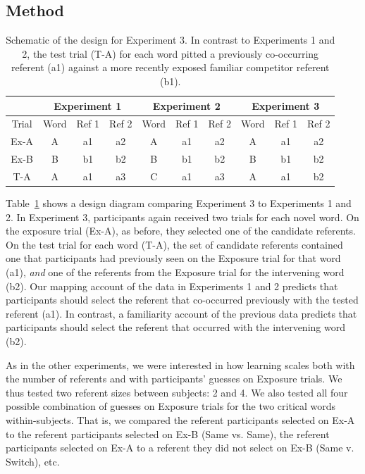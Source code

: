 \documentclass[man,floatsintext]{apa6}
\begin{document}
\subsection{Method}

\begin{table}[tb]
\begin{center}
\begin{tabular}{| c | c c c | c c c | c c c |}
\multicolumn{1}{c}{ }
 & \multicolumn{3}{c}{Experiment 1}
 & \multicolumn{3}{c}{Experiment 2}
 & \multicolumn{3}{c}{Experiment 3} \\
 \hline
Trial & Word & Ref 1 & Ref 2 & Word & Ref 1 & Ref 2 & Word & Ref 1 & Ref 2 \\ 
\hline
Ex-A& A & a1 & a2 & A & a1 & a2 & A & a1 & a2 \\ 
Ex-B & B & b1 & b2 & B & b1 & b2 & B & b1 & b2 \\ 
T-A & A & a1 & a3 & C & a1 & a3 & A & a1 & b2 \\ 
\hline
\end{tabular}
\end{center}
\vspace{6pt}
\caption{\label{tab:exp3_design}Schematic of the design for Experiment 3. In contrast to Experiments 1 and 2, the test trial (T-A) for each word pitted a previously co-occurring referent (a1) against a more recently exposed familiar competitor referent (b1).}
\end{table}

Table~\ref{tab:exp3_design} shows a design diagram comparing Experiment 3 to Experiments 1 and 2. In Experiment 3, participants again received two trials for each novel word. On the exposure trial (Ex-A), as before, they selected one of the candidate referents. On the test trial for each word (T-A), the set of candidate referents contained one that participants had previously seen on the Exposure trial for that word (a1), \emph{and} one of the referents from the Exposure trial for the intervening word (b2). Our mapping account of the data in Experiments 1 and 2 predicts that participants should select the referent that co-occurred previously with the tested referent (a1). In contrast, a familiarity account of the previous data predicts that participants should select the referent that occurred with the intervening word (b2).

As in the other experiments, we were interested in how learning scales both with the number of referents and with participants' guesses on Exposure trials. We thus tested two referent sizes between subjects: 2 and 4. We also tested all four possible combination of guesses on Exposure trials for the two critical words within-subjects. That is, we compared the referent participants selected on Ex-A to the referent participants selected on Ex-B (Same vs. Same), the referent participants selected on Ex-A to a referent they did not select on Ex-B (Same v. Switch), etc. 
\end{document}
